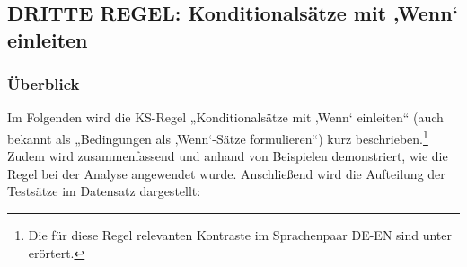 \subsection{DRITTE REGEL: Konditionalsätze mit ‚Wenn‘ einleiten}
\label{sec:5.3.3}

 \subsubsection{\label{sec:5.3.3.0}Überblick}

Im Folgenden wird die KS-Regel „Konditionalsätze mit ‚Wenn‘ einleiten“ (auch bekannt als „Bedingungen als ‚Wenn‘-Sätze formulieren“) kurz beschrieben.\footnote{\textrm{Die für diese Regel relevanten Kontraste im Sprachenpaar DE-EN sind unter  erörtert.} } Zudem wird zusammenfassend und anhand von Beispielen demonstriert, wie die Regel bei der Analyse angewendet wurde. Anschließend wird die Aufteilung der Testsätze im Datensatz dargestellt:

